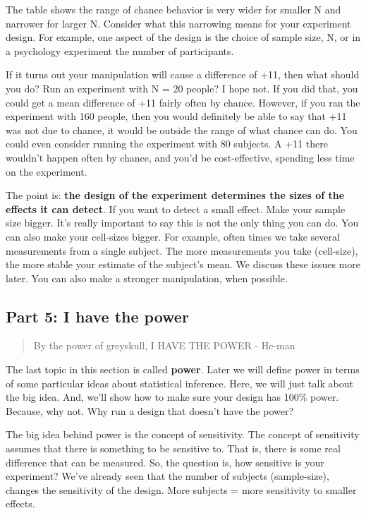 \documentclass[
  letterpaper,
  DIV=11,
  numbers=noendperiod]{scrreprt}
\begin{document}
The table shows the range of chance behavior is very wider for smaller N
and narrower for larger N. Consider what this narrowing means for your
experiment design. For example, one aspect of the design is the choice
of sample size, N, or in a psychology experiment the number of
participants.

If it turns out your manipulation will cause a difference of +11, then
what should you do? Run an experiment with N = 20 people? I hope not. If
you did that, you could get a mean difference of +11 fairly often by
chance. However, if you ran the experiment with 160 people, then you
would definitely be able to say that +11 was not due to chance, it would
be outside the range of what chance can do. You could even consider
running the experiment with 80 subjects. A +11 there wouldn't happen
often by chance, and you'd be cost-effective, spending less time on the
experiment.

The point is: \textbf{the design of the experiment determines the sizes
of the effects it can detect}. If you want to detect a small effect.
Make your sample size bigger. It's really important to say this is not
the only thing you can do. You can also make your cell-sizes bigger. For
example, often times we take several measurements from a single subject.
The more measurements you take (cell-size), the more stable your
estimate of the subject's mean. We discuss these issues more later. You
can also make a stronger manipulation, when possible.

\subsection{Part 5: I have the power}\label{part-5-i-have-the-power}

\begin{quote}
By the power of greyskull, I HAVE THE POWER - He-man
\end{quote}

The last topic in this section is called \textbf{power}. Later we will
define power in terms of some particular ideas about statistical
inference. Here, we will just talk about the big idea. And, we'll show
how to make sure your design has 100\% power. Because, why not. Why run
a design that doesn't have the power?

The big idea behind power is the concept of sensitivity. The concept of
sensitivity assumes that there is something to be sensitive to. That is,
there is some real difference that can be measured. So, the question is,
how sensitive is your experiment? We've already seen that the number of
subjects (sample-size), changes the sensitivity of the design. More
subjects = more sensitivity to smaller effects.
\end{document}
